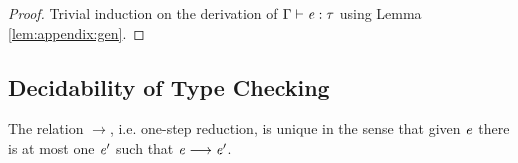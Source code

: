 \begin{proof}
    Trivial induction on the derivation of $\Gamma  \vdash  \mathit{e}  :  \tau$ using Lemma
\ref{lem:appendix:gen}.
\end{proof}

\subsection{Decidability of Type Checking}
\begin{lem}\label{lem:appendix:unired}
	The relation $ \longrightarrow $, i.e. one-step reduction, is unique in the sense that
given $\mathit{e}$ there is at most one $\mathit{e'}$ such that $\mathit{e}  \longrightarrow  \mathit{e'}$.
\end{lem}

